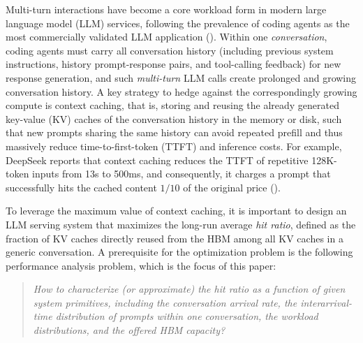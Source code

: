 \documentclass{article}
\theoremstyle{definition}
\begin{document}
Multi-turn interactions have become a core workload form in modern large language model (LLM) services, following the prevalence of coding agents as the most commercially validated LLM application (\cite{github2025codingagent, anthropic2026claudecode}).
Within one \textit{conversation}, 
coding agents must carry all conversation history (including previous system instructions, history prompt-response pairs, and tool-calling feedback) for new response generation, and such \textit{multi-turn} LLM calls create prolonged and growing conversation history. A key strategy to hedge against the correspondingly growing compute is context caching, that is, storing and reusing the already generated key-value (KV) caches of the conversation history in the memory or disk, such that new prompts sharing the same history can avoid repeated prefill and thus massively reduce time-to-first-token (TTFT) and inference costs. For example, DeepSeek reports that context caching reduces the TTFT of repetitive 128K-token inputs from 13s to 500ms, and consequently, it charges a prompt that successfully hits the cached content $1/10$ of the original price (\cite{deepseek2024contextcache}). 

To leverage the maximum value of context caching, it is important to design an LLM serving system that
maximizes the long-run average \textit{hit ratio}, defined as the fraction of KV caches directly reused from the HBM among all KV caches in a generic conversation. A prerequisite for the optimization problem is the following performance analysis problem, which is the focus of this paper:

\vspace{-0.5em}

\begin{quote}
\textit{How to characterize (or approximate) the hit ratio as a function of given system primitives, including the conversation arrival rate, the interarrival-time distribution of prompts within one conversation, the workload distributions, and the offered HBM capacity?}
\end{quote}
\vspace{-0.5em}
\vspace{-0.5em}
\end{document}
